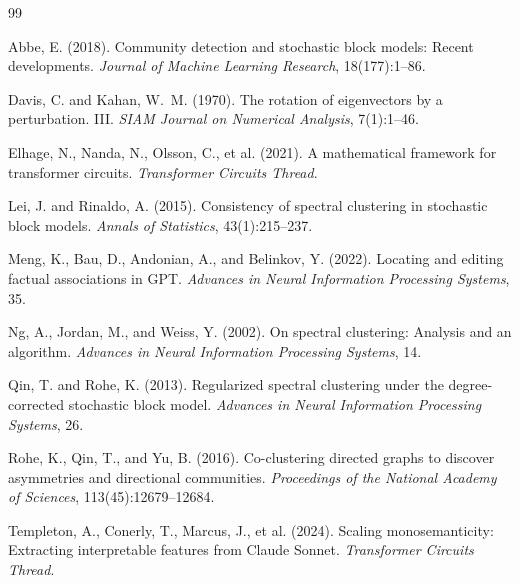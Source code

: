 \documentclass[11pt]{article}
\newcommand{\1}{\mathbbm{1}}
\begin{document}

\begin{thebibliography}{99}

Abbe, E. (2018).
\newblock Community detection and stochastic block models: Recent developments.
\newblock \emph{Journal of Machine Learning Research}, 18(177):1--86.

Davis, C. and Kahan, W.~M. (1970).
\newblock The rotation of eigenvectors by a perturbation. III.
\newblock \emph{SIAM Journal on Numerical Analysis}, 7(1):1--46.

Elhage, N., Nanda, N., Olsson, C., et al. (2021).
\newblock A mathematical framework for transformer circuits.
\newblock \emph{Transformer Circuits Thread}.

Lei, J. and Rinaldo, A. (2015).
\newblock Consistency of spectral clustering in stochastic block models.
\newblock \emph{Annals of Statistics}, 43(1):215--237.

Meng, K., Bau, D., Andonian, A., and Belinkov, Y. (2022).
\newblock Locating and editing factual associations in {GPT}.
\newblock \emph{Advances in Neural Information Processing Systems}, 35.

Ng, A., Jordan, M., and Weiss, Y. (2002).
\newblock On spectral clustering: Analysis and an algorithm.
\newblock \emph{Advances in Neural Information Processing Systems}, 14.

Qin, T. and Rohe, K. (2013).
\newblock Regularized spectral clustering under the degree-corrected stochastic block model.
\newblock \emph{Advances in Neural Information Processing Systems}, 26.

Rohe, K., Qin, T., and Yu, B. (2016).
\newblock Co-clustering directed graphs to discover asymmetries and directional communities.
\newblock \emph{Proceedings of the National Academy of Sciences}, 113(45):12679--12684.

Templeton, A., Conerly, T., Marcus, J., et al. (2024).
\newblock Scaling monosemanticity: Extracting interpretable features from {Claude} {Sonnet}.
\newblock \emph{Transformer Circuits Thread}.


\end{thebibliography}
\end{document}
